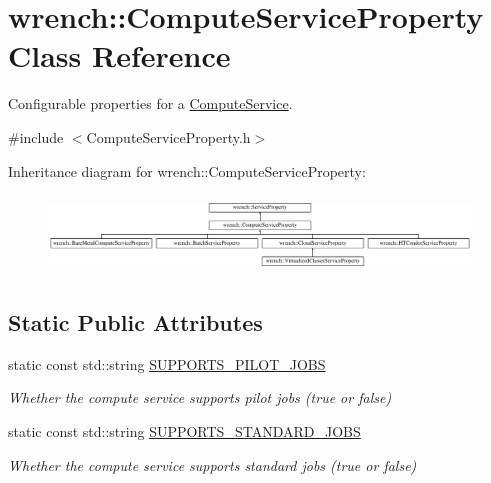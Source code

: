 \hypertarget{classwrench_1_1_compute_service_property}{}\section{wrench\+:\+:Compute\+Service\+Property Class Reference}
\label{classwrench_1_1_compute_service_property}


Configurable properties for a \hyperlink{classwrench_1_1_compute_service}{Compute\+Service}.  




{\ttfamily \#include $<$Compute\+Service\+Property.\+h$>$}

Inheritance diagram for wrench\+:\+:Compute\+Service\+Property\+:\begin{figure}[H]
\begin{center}
\leavevmode
\includegraphics[height=2.089552cm]{classwrench_1_1_compute_service_property}
\end{center}
\end{figure}
\subsection*{Static Public Attributes}
\begin{DoxyCompactItemize}
\item 
\mbox{\label{classwrench_1_1_compute_service_property_af0abab1e3bce4932c4482031f0c31ce8}} 
static const std\+::string \hyperlink{classwrench_1_1_compute_service_property_af0abab1e3bce4932c4482031f0c31ce8}{S\+U\+P\+P\+O\+R\+T\+S\+\_\+\+P\+I\+L\+O\+T\+\_\+\+J\+O\+BS}
\begin{DoxyCompactList}\small\item\em Whether the compute service supports pilot jobs (true or false) \end{DoxyCompactList}\item 
\mbox{\label{classwrench_1_1_compute_service_property_a4e1b5e2e1effa86cfac0da608f112c14}} 
static const std\+::string \hyperlink{classwrench_1_1_compute_service_property_a4e1b5e2e1effa86cfac0da608f112c14}{S\+U\+P\+P\+O\+R\+T\+S\+\_\+\+S\+T\+A\+N\+D\+A\+R\+D\+\_\+\+J\+O\+BS}
\begin{DoxyCompactList}\small\item\em Whether the compute service supports standard jobs (true or false) \end{DoxyCompactList}\end{DoxyCompactItemize}


